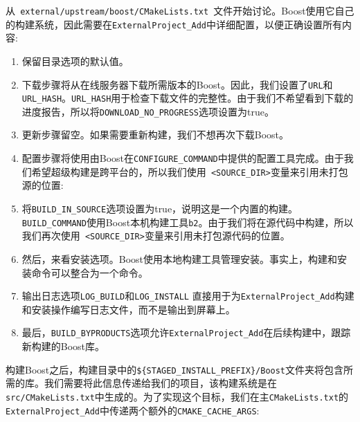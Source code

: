 从\texttt{ external/upstream/boost/CMakeLists.txt }文件开始讨论。Boost使用它自己的构建系统，因此需要在\texttt{ExternalProject\_Add}中详细配置，以便正确设置所有内容:

\begin{enumerate}
\item 保留目录选项的默认值。

\item 下载步骤将从在线服务器下载所需版本的Boost。因此，我们设置了\texttt{URL}和\texttt{URL\_HASH}。\texttt{URL\_HASH}用于检查下载文件的完整性。由于我们不希望看到下载的进度报告，所以将\texttt{DOWNLOAD\_NO\_PROGRESS}选项设置为true。

\item 更新步骤留空。如果需要重新构建，我们不想再次下载Boost。

\item 配置步骤将使用由Boost在\texttt{CONFIGURE\_COMMAND}中提供的配置工具完成。由于我们希望超级构建是跨平台的，所以我们使用\texttt{ <SOURCE\_DIR>}变量来引用未打包源的位置:


\item 将\texttt{BUILD\_IN\_SOURCE}选项设置为true，说明这是一个内置的构建。\texttt{BUILD\_COMMAND}使用Boost本机构建工具\texttt{b2}。由于我们将在源代码中构建，所以我们再次使用\texttt{ <SOURCE\_DIR>}变量来引用未打包源代码的位置。

\item 然后，来看安装选项。Boost使用本地构建工具管理安装。事实上，构建和安装命令可以整合为一个命令。

\item 输出日志选项\texttt{LOG\_BUILD}和\texttt{LOG\_INSTALL} 直接用于为\texttt{ExternalProject\_Add}构建和安装操作编写日志文件，而不是输出到屏幕上。

\item 最后，\texttt{BUILD\_BYPRODUCTS}选项允许\texttt{ExternalProject\_Add}在后续构建中，跟踪新构建的Boost库。

\end{enumerate}

构建Boost之后，构建目录中的\texttt{\$\{STAGED\_INSTALL\_PREFIX\}/Boost}文件夹将包含所需的库。我们需要将此信息传递给我们的项目，该构建系统是在\texttt{src/CMakeLists.txt}中生成的。为了实现这个目标，我们在主\texttt{CMakeLists.txt}的\texttt{ExternalProject\_Add}中传递两个额外的\texttt{CMAKE\_CACHE\_ARGS}:

